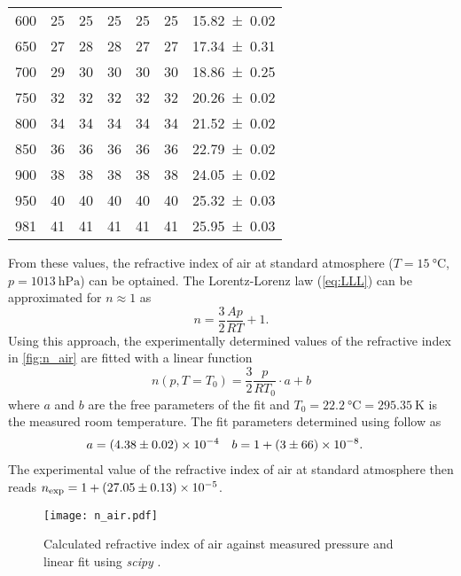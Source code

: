 \begin{table}
\begin{tabular}{c | c c c c c | c}
    {600} & {25} & {25} & {25} & {25} & {25} & \num{15.82+-0.02}\\
    {650} & {27} & {28} & {28} & {27} & {27} & \num{17.34+-0.31}\\
    {700} & {29} & {30} & {30} & {30} & {30} & \num{18.86+-0.25}\\
    {750} & {32} & {32} & {32} & {32} & {32} & \num{20.26+-0.02}\\
    {800} & {34} & {34} & {34} & {34} & {34} & \num{21.52+-0.02}\\
    {850} & {36} & {36} & {36} & {36} & {36} & \num{22.79+-0.02}\\
    {900} & {38} & {38} & {38} & {38} & {38} & \num{24.05+-0.02}\\
    {950} & {40} & {40} & {40} & {40} & {40} & \num{25.32+-0.03}\\
    {981} & {41} & {41} & {41} & {41} & {41} & \num{25.95+-0.03}\\
    \bottomrule
  \end{tabular}
\end{table}
From these values, the refractive index of air at standard atmosphere ($T = \qty{15}{\degreeCelsius}$, $p = \qty{1013}{\hecto\pascal}$) can be optained. The Lorentz-Lorenz law 
(\autoref{eq:LLL}) can be approximated for $n \approx 1$ as 
\begin{equation*}
  n = \frac{3}{2}\frac{Ap}{RT} + 1.
\end{equation*}
Using this approach, the experimentally determined values of the refractive index in \autoref{fig:n_air} are fitted with a linear function 
\begin{equation*}
  n(p, T = T_0) = \frac{3}{2}\frac{p}{RT_0} \cdot a + b 
\end{equation*}
where $a$ and $b$ are the free parameters of the fit and $T_0 = \qty{22.2}{\degreeCelsius} = \qty{295.35}{\kelvin}$ is the measured room temperature.
The fit parameters determined using  \cite{scipy} follow as 
\begin{align*}
  a &= \num{4.38 +- 0.02e-4} & b &= 1 + \num{3 +- 66e-8}.
\end{align*}
The experimental value of the refractive index of air at standard atmosphere then reads $n_\text{exp} = 1 + \num{27.05+-0.13e-5}$.

\begin{figure}
  \centering
  \texttt{[image: n\_air.pdf]}
  \caption{Calculated refractive index of air against measured pressure and linear fit using \textit{scipy} \cite{scipy}.}
  \label{fig:n_air}
\end{figure}
